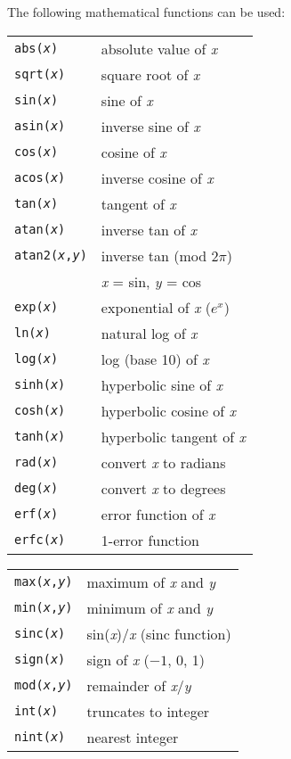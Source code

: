 The following mathematical functions can be used:

{\small
\begin{tabular}{ll}
{\tt abs({\it x})}&absolute value of {\it x}\\
{\tt sqrt({\it x})}&square root of {\it x}  \\
{\tt sin({\it x})}&sine of {\it x}\\
{\tt asin({\it x})}&inverse sine of {\it x}\\
{\tt cos({\it x})}&cosine of {\it x}\\
{\tt acos({\it x})}&inverse cosine of {\it x}\\
{\tt tan({\it x})}&tangent of {\it x}\\
{\tt atan({\it x})}&inverse tan of {\it x}\\
{\tt atan2({\it x},{\it y})}&inverse tan (mod 2$\pi$)\\
 &{\it x} = sin, {\it y} = cos\\
{\tt exp({\it x})}&exponential of {\it x} ($e^x$)\\
{\tt ln({\it x})}&natural log of {\it x}\\
{\tt log({\it x})}&log (base 10) of {\it x}\\
{\tt sinh({\it x})}&hyperbolic sine of {\it x}\\
{\tt cosh({\it x})}&hyperbolic cosine of {\it x}\\
{\tt tanh({\it x})}&hyperbolic tangent of {\it x}\\
{\tt rad({\it x})}&convert {\it x} to radians\\
{\tt deg({\it x})}&convert {\it x} to degrees\\
{\tt erf({\it x})}&error function of {\it x}\\
{\tt erfc({\it x})}&1-error function\\
\end{tabular}
\begin{tabular}{ll}
{\tt max({\it x},{\it y})}&maximum of {\it x} and {\it y}\\
{\tt min({\it x},{\it y})}&minimum of {\it x} and {\it y}\\
{\tt sinc({\it x})}&sin({\it x})/{\it x} (sinc function)\\
{\tt sign({\it x})}&sign of {\it x} ($-1$, 0, 1)\\
{\tt mod({\it x},{\it y})}&remainder of {\it x}/{\it y}\\
{\tt int({\it x})}&truncates to integer\\
{\tt nint({\it x})}&nearest integer\\

\end{tabular}}
